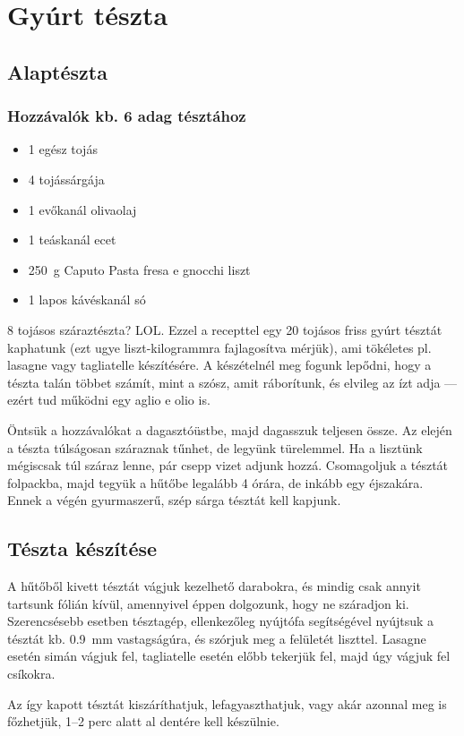 \newpage
\section*{Gyúrt tészta} \label{sec:gyurt-teszta}

\subsection*{Alaptészta}
\subsubsection*{Hozzávalók kb. 6 adag tésztához}
\begin{itemize}
    \item \num{1} egész tojás
    \item \num{4} tojássárgája
    \item \num{1} evőkanál olivaolaj
    \item \num{1} teáskanál ecet
    \item \qty{250}{\g} Caputo Pasta fresa e gnocchi liszt
    \item \num{1} lapos kávéskanál só
\end{itemize}

\num{8} tojásos száraztészta? LOL. Ezzel a recepttel egy \num{20} tojásos friss gyúrt tésztát kaphatunk (ezt ugye liszt-kilogrammra fajlagosítva mérjük), ami tökéletes pl. lasagne vagy tagliatelle készítésére. A készételnél meg fogunk lepődni, hogy a tészta talán többet számít, mint a szósz, amit ráborítunk, és elvileg az ízt adja --- ezért tud működni egy aglio e olio is.

Öntsük a hozzávalókat a dagasztóüstbe, majd dagasszuk teljesen össze. Az elején a tészta túlságosan száraznak tűnhet, de legyünk türelemmel. Ha a lisztünk mégiscsak túl száraz lenne, pár csepp vizet adjunk hozzá. Csomagoljuk a tésztát folpackba, majd tegyük a hűtőbe legalább \num{4} órára, de inkább egy éjszakára. Ennek a végén gyurmaszerű, szép sárga tésztát kell kapjunk.~\cite{szell_gyurt_teszta}

\subsection*{Tészta készítése}
A hűtőből kivett tésztát vágjuk kezelhető darabokra, és mindig csak annyit tartsunk fólián kívül, amennyivel éppen dolgozunk, hogy ne száradjon ki. Szerencsésebb esetben tésztagép, ellenkezőleg nyújtófa segítségével nyújtsuk a tésztát kb. \qty{0.9}{\mm} vastagságúra, és szórjuk meg a felületét liszttel. Lasagne esetén simán vágjuk fel, tagliatelle esetén előbb tekerjük fel, majd úgy vágjuk fel csíkokra.

Az így kapott tésztát kiszáríthatjuk, lefagyaszthatjuk, vagy akár azonnal meg is főzhetjük, \numrange{1}{2} perc alatt al dentére kell készülnie.

